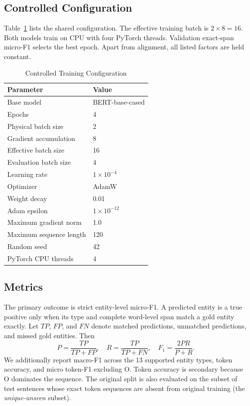 \documentclass[conference]{IEEEtran}
\begin{document}
\subsection{Controlled Configuration}
Table~\ref{tab:hyperparameters} lists the shared configuration. The effective training batch is $2\times8=16$. Both models train on CPU with four PyTorch threads. Validation exact-span micro-F1 selects the best epoch. Apart from alignment, all listed factors are held constant.

\begin{table}[t]
\caption{Controlled Training Configuration}
\label{tab:hyperparameters}
\centering
\small
\begin{tabular}{ll}
\toprule
Parameter & Value \\
\midrule
Base model & BERT-base-cased \\
Epochs & 4 \\
Physical batch size & 2 \\
Gradient accumulation & 8 \\
Effective batch size & 16 \\
Evaluation batch size & 4 \\
Learning rate & $1\times10^{-4}$ \\
Optimizer & AdamW \\
Weight decay & 0.01 \\
Adam epsilon & $1\times10^{-12}$ \\
Maximum gradient norm & 1.0 \\
Maximum sequence length & 120 \\
Random seed & 42 \\
PyTorch CPU threads & 4 \\
\bottomrule
\end{tabular}
\end{table}

\subsection{Metrics}
The primary outcome is strict entity-level micro-F1. A predicted entity is a true positive only when its type and complete word-level span match a gold entity exactly. Let $TP$, $FP$, and $FN$ denote matched predictions, unmatched predictions, and missed gold entities. Then
\begin{equation}
P=\frac{TP}{TP+FP},\quad R=\frac{TP}{TP+FN},\quad F_1=\frac{2PR}{P+R}.
\end{equation}
We additionally report macro-F1 across the 13 supported entity types, token accuracy, and micro token-F1 excluding O. Token accuracy is secondary because O dominates the sequence. The original split is also evaluated on the subset of test sentences whose exact token sequences are absent from original training (the \emph{unique-unseen} subset).
\end{document}
